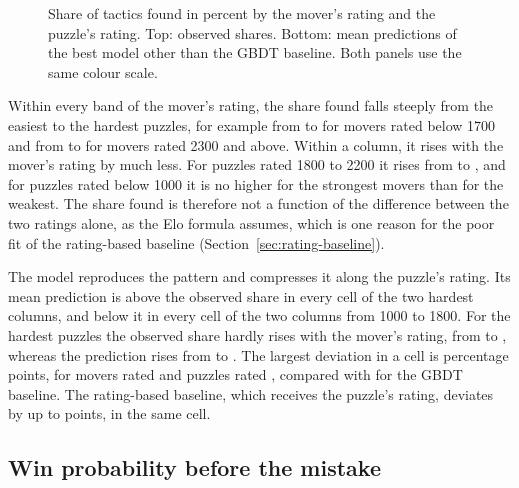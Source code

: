 \documentclass[11pt]{article}
\begin{document}
\begin{figure}[htbp]\centering
{}

\medskip
{}
\caption{Share of tactics found in percent by the mover's rating and the
puzzle's rating. Top: observed shares. Bottom: mean predictions of the best
model other than the GBDT baseline. Both panels use the same colour scale.}
\label{fig:grid-ratings}
\end{figure}

Within every band of the mover's rating, the share found falls steeply from
the easiest to the hardest puzzles, for example from
 to
 for movers rated below 1700 and from
 to
 for movers rated 2300 and above. Within
a column, it rises with the mover's rating by much less. For puzzles rated
1800 to 2200 it rises from  to
, and for puzzles rated below 1000
it is no higher for the strongest movers than for the weakest. The share
found is therefore not a function of the difference between the two ratings
alone, as the Elo formula assumes, which is one reason for the poor fit of
the rating-based baseline (Section~\ref{sec:rating-baseline}).

The model reproduces the pattern and compresses it along the puzzle's
rating. Its mean prediction is above the observed share in every cell of the
two hardest columns, and below it in every cell of the two columns from 1000
to 1800. For the hardest puzzles the observed share hardly rises with the
mover's rating, from  to
, whereas the prediction rises from
 to . The
largest deviation in a cell is
 percentage
points, for movers rated
 and
puzzles rated
,
compared with  for the GBDT baseline. The
rating-based baseline, which receives the puzzle's rating, deviates by up to
 points, in the same cell.

\subsection{Win probability before the mistake}
\end{document}
